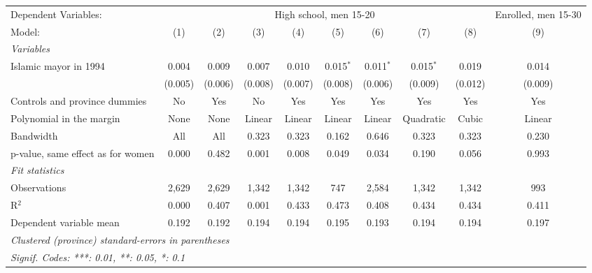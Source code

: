 
\begingroup
\centering
\begin{adjustbox}{max width=\textwidth}
   \begin{tabular}{lccccccccc}
      \tabularnewline \midrule \midrule
      Dependent Variables: & \multicolumn{8}{c}{High school, men 15-20} & Enrolled, men 15-30\\
      Model:                            & (1)     & (2)     & (3)     & (4)     & (5)         & (6)         & (7)         & (8)     & (9)\\  
      \midrule
      \emph{Variables}\\
      Islamic mayor in 1994             & 0.004   & 0.009   & 0.007   & 0.010   & 0.015$^{*}$ & 0.011$^{*}$ & 0.015$^{*}$ & 0.019   & 0.014\\   
                                        & (0.005) & (0.006) & (0.008) & (0.007) & (0.008)     & (0.006)     & (0.009)     & (0.012) & (0.009)\\   
      Controls and province dummies     & No      & Yes     & No      & Yes     & Yes         & Yes         & Yes         & Yes     & Yes\\  
      Polynomial in the margin          & None    & None    & Linear  & Linear  & Linear      & Linear      & Quadratic   & Cubic   & Linear\\  
      Bandwidth                         & All     & All     & 0.323   & 0.323   & 0.162       & 0.646       & 0.323       & 0.323   & 0.230\\  
      p-value, same effect as for women & 0.000   & 0.482   & 0.001   & 0.008   & 0.049       & 0.034       & 0.190       & 0.056   & 0.993\\  
      \midrule
      \emph{Fit statistics}\\
      Observations                      & 2,629   & 2,629   & 1,342   & 1,342   & 747         & 2,584       & 1,342       & 1,342   & 993\\  
      R$^2$                             & 0.000   & 0.407   & 0.001   & 0.433   & 0.473       & 0.408       & 0.434       & 0.434   & 0.411\\  
      Dependent variable mean           & 0.192   & 0.192   & 0.194   & 0.194   & 0.195       & 0.193       & 0.194       & 0.194   & 0.197\\  
      \midrule \midrule
      \multicolumn{10}{l}{\emph{Clustered (province) standard-errors in parentheses}}\\
      \multicolumn{10}{l}{\emph{Signif. Codes: ***: 0.01, **: 0.05, *: 0.1}}\\
   \end{tabular}
\end{adjustbox}
\par\endgroup


